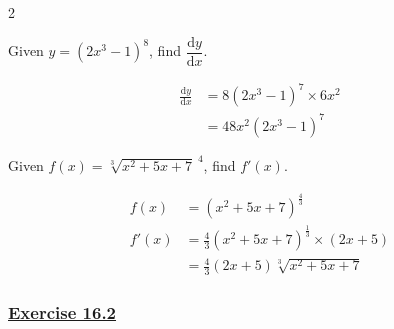 \documentclass[
  11pt,
  openany]{book}
\begin{document}
\begin{multicols}{2}

\begin{tcolorbox}[title=Example,colback=RoyalBlue!2!, colframe=RoyalBlue,width=8.5cm,height=5.2cm]

Given $y=(2x^3-1)^8$, find $\dfrac{\text{d}y}{\text{d}x}$.

\vspace{-0.1cm}
\tcblower

\vspace{-0.1cm}

\begin{align*}
\frac{\text{d}y}{\text{d}x}&=8(2x^3-1)^7\times 6x^2\\[1em]
&=48x^2(2x^3-1)^7
\end{align*}

\end{tcolorbox}


\begin{tcolorbox}[title=Example,colback=RoyalBlue!2!, colframe=RoyalBlue,width=8.5cm,height=5.2cm]

Given $f(x)=\sqrt[3]{x^2+5x+7}^{\;4}$, find $f'(x)$.

\vspace{-0.1cm}
\tcblower

\vspace{-0.3cm}

\begin{align*}
f(x)&=(x^2+5x+7)^{\frac{4}{3}}\\[0.5em]
f'(x)&=\tfrac{4}{3}(x^2+5x+7)^{\frac{1}{3}}\times(2x+5)\\[0.5em]
&=\tfrac{4}{3}(2x+5)\sqrt[3]{x^2+5x+7}
\end{align*}

\end{tcolorbox}

\end{multicols}

\vspace{-1cm}

\label{ex162q}{}

\subsubsection*{\texorpdfstring{\hyperref[ex162a]{Exercise 16.2}}{Exercise 16.2}}\label{exercise-16.2}

\vspace{-0.5cm}
\end{document}
